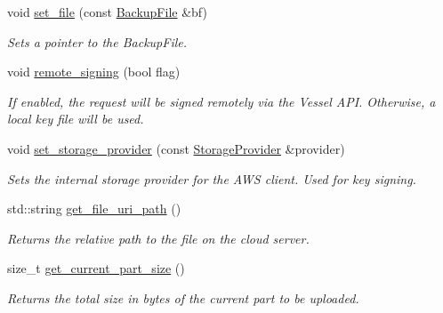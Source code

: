 \begin{DoxyCompactItemize}
\mbox{\label{class_vessel_1_1_networking_1_1_aws_s3_client_a947727d7f26407fafd7c5987e1a68c88}} 
void \hyperlink{class_vessel_1_1_networking_1_1_aws_s3_client_a947727d7f26407fafd7c5987e1a68c88}{set\+\_\+file} (const \hyperlink{class_vessel_1_1_file_1_1_backup_file}{Backup\+File} \&bf)
\begin{DoxyCompactList}\small\item\em Sets a pointer to the Backup\+File. \end{DoxyCompactList}\item 
\mbox{\label{class_vessel_1_1_networking_1_1_aws_s3_client_a5dbe469161a506de0a5e6ec74461328a}} 
void \hyperlink{class_vessel_1_1_networking_1_1_aws_s3_client_a5dbe469161a506de0a5e6ec74461328a}{remote\+\_\+signing} (bool flag)
\begin{DoxyCompactList}\small\item\em If enabled, the request will be signed remotely via the Vessel A\+PI. Otherwise, a local key file will be used. \end{DoxyCompactList}\item 
\mbox{\label{class_vessel_1_1_networking_1_1_aws_s3_client_a96e454d8d46844fcddc7a72e639aa80e}} 
void \hyperlink{class_vessel_1_1_networking_1_1_aws_s3_client_a96e454d8d46844fcddc7a72e639aa80e}{set\+\_\+storage\+\_\+provider} (const \hyperlink{struct_vessel_1_1_types_1_1_storage_provider}{Storage\+Provider} \&provider)
\begin{DoxyCompactList}\small\item\em Sets the internal storage provider for the A\+WS client. Used for key signing. \end{DoxyCompactList}\item 
std\+::string \hyperlink{class_vessel_1_1_networking_1_1_aws_s3_client_a00d6b781a56662ed5e80c9032fe1c380}{get\+\_\+file\+\_\+uri\+\_\+path} ()
\begin{DoxyCompactList}\small\item\em Returns the relative path to the file on the cloud server. \end{DoxyCompactList}\item 
size\+\_\+t \hyperlink{class_vessel_1_1_networking_1_1_aws_s3_client_ae836c56e69d9ac911f660d0c4d8d0ebc}{get\+\_\+current\+\_\+part\+\_\+size} ()
\begin{DoxyCompactList}\small\item\em Returns the total size in bytes of the current part to be uploaded. \end{DoxyCompactList}\end{DoxyCompactItemize}
